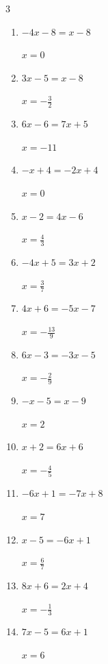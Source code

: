 \begin{multicols}{3}
\begin{enumerate}
        $\displaystyle x=\frac{6}{11}$

  \item $-4x-8=x-8$

        $\displaystyle x=0$

  \item $3x-5=x-8$

        $\displaystyle x=-\frac{3}{2}$

  \item $6x-6=7x+5$

        $\displaystyle x=-11$

  \item $-x+4=-2x+4$

        $\displaystyle x=0$

  \item $x-2=4x-6$

        $\displaystyle x=\frac{4}{3}$

  \item $-4x+5=3x+2$

        $\displaystyle x=\frac{3}{7}$

  \item $4x+6=-5x-7$

        $\displaystyle x=-\frac{13}{9}$

  \item $6x-3=-3x-5$

        $\displaystyle x=-\frac{2}{9}$

  \item $-x-5=x-9$

        $\displaystyle x=2$

  \item $x+2=6x+6$

        $\displaystyle x=-\frac{4}{5}$

  \item $-6x+1=-7x+8$

        $\displaystyle x=7$

  \item $x-5=-6x+1$

        $\displaystyle x=\frac{6}{7}$

\columnbreak %

\resetques

  \item $8x+6=2x+4$

        $\displaystyle x=-\frac{1}{3}$

  \item $7x-5=6x+1$

        $\displaystyle x=6$


\end{enumerate}
\end{multicols}
